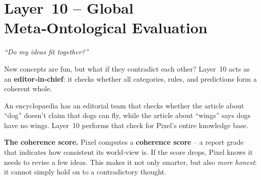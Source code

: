 \section{Layer~10 – Global Meta‑Ontological Evaluation}
\label{sec:layer10}

\begin{tcolorbox}[colback=blue!5, colframe=blue!60, title=\textbf{Superpower: The Editor}]
\begin{center}
\textit{“Do my ideas fit together?”}
\end{center}
\end{tcolorbox}

New concepts are fun, but what if they contradict each other?  Layer~10
acts as an \textbf{editor‑in‑chief}: it checks whether all categories,
rules, and predictions form a coherent whole.

\begin{tcolorbox}[colback=yellow!5, colframe=yellow!80, title=Real‑life analogy]
An encyclopaedia has an editorial team that checks whether the article
about “dog” doesn’t claim that dogs can fly, while the article about
“wings” says dogs have no wings.  Layer~10 performs that check for
Pixel’s entire knowledge base.
\end{tcolorbox}

\textbf{The coherence score.}
Pixel computes a \textbf{coherence score} – a report grade that
indicates how consistent its world‑view is.  If the score drops,
Pixel knows it needs to revise a few ideas.  This makes it not only
smarter, but also \emph{more honest}: it cannot simply hold on to a
contradictory thought.